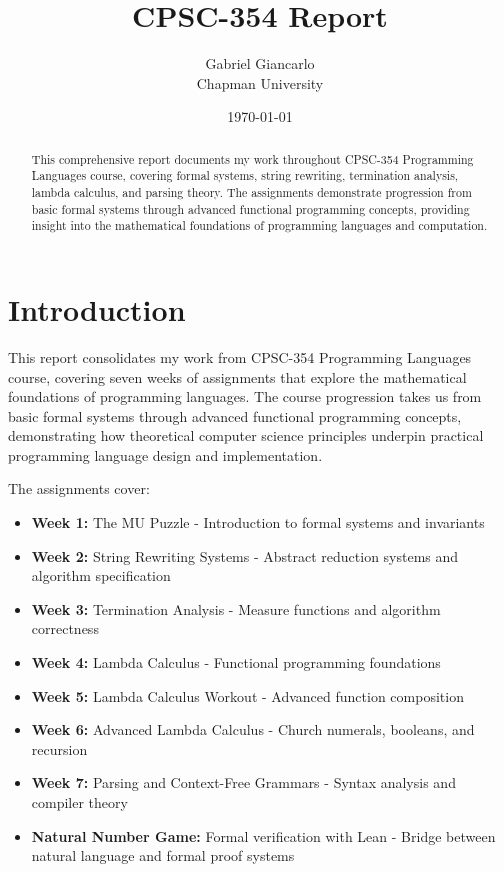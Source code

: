 \documentclass{article}
\title{CPSC-354 Report}
\author{Gabriel Giancarlo \\ Chapman University}
\date{\today}
\theoremstyle{plain}
\theoremstyle{definition}
\theoremstyle{remark}
\begin{document}
\maketitle

\begin{abstract}
This comprehensive report documents my work throughout CPSC-354 Programming Languages course, covering formal systems, string rewriting, termination analysis, lambda calculus, and parsing theory. The assignments demonstrate progression from basic formal systems through advanced functional programming concepts, providing insight into the mathematical foundations of programming languages and computation.
\end{abstract}

\setcounter{tocdepth}{3}
\tableofcontents

\section{Introduction}\label{intro}

This report consolidates my work from CPSC-354 Programming Languages course, covering seven weeks of assignments that explore the mathematical foundations of programming languages. The course progression takes us from basic formal systems through advanced functional programming concepts, demonstrating how theoretical computer science principles underpin practical programming language design and implementation.

The assignments cover:
\begin{itemize}
\item \textbf{Week 1:} The MU Puzzle - Introduction to formal systems and invariants
\item \textbf{Week 2:} String Rewriting Systems - Abstract reduction systems and algorithm specification
\item \textbf{Week 3:} Termination Analysis - Measure functions and algorithm correctness
\item \textbf{Week 4:} Lambda Calculus - Functional programming foundations
\item \textbf{Week 5:} Lambda Calculus Workout - Advanced function composition
\item \textbf{Week 6:} Advanced Lambda Calculus - Church numerals, booleans, and recursion
\item \textbf{Week 7:} Parsing and Context-Free Grammars - Syntax analysis and compiler theory
\item \textbf{Natural Number Game:} Formal verification with Lean - Bridge between natural language and formal proof systems
\end{itemize}
\end{document}
